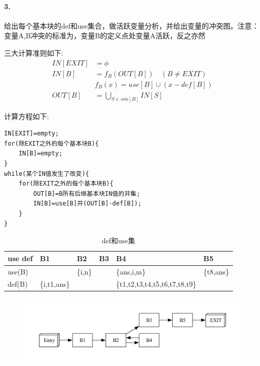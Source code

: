 \documentclass[UTF8]{ctexart} %
\begin{document}
\paragraph{3.} 给出每个基本块的def和use集合，做活跃变量分析，并给出变量的冲突图。注意：变量A,B冲突的标准为，变量B的定义点处变量A活跃，反之亦然

三大计算准则如下:
\begin{equation}
    \begin{aligned}
        IN[EXIT] & =\phi                            \\
        IN[B]    & =f_B(OUT[B]) \quad (B\neq EXIT)  \\
                 & f_B(x)    =use[B]\cup (x-def[B]) \\
        OUT[B]   & =\bigcup_{S\in son[B]}IN[S]
    \end{aligned}
\end{equation}

计算方程如下:
\begin{lstlisting}
IN[EXIT]=empty;
for(除EXIT之外的每个基本块B){
    IN[B]=empty;
}
while(某个IN值发生了改变){
    for(除EXIT之外的每个基本块B){
        OUT[B]=B所有后继基本块IN值的并集;
        IN[B]=use[B]并(OUT[B]-def[B]);
    }
}
\end{lstlisting}

\newpage

\begin{table}[H]
    \centering
    \begin{tabular}{|p{1.1cm}<{\centering}|p{1.55cm}<{\centering}|p{0.8cm}<{\centering}|p{0.45cm}<{\centering}|p{4.2cm}<{\centering}|p{1.4cm}<{\centering}|}
        \hline
        use def & B1           & B2      & B3 & B4                             & B5         \\
        \hline
        use(B)  &              & \{i,n\} &    & \{ans,i,m\}                    & \{t8,ans\} \\
        \hline
        def(B)  & \{i,t1,ans\} &         &    & \{t1,t2,t3,t4,t5,t6,t7,t8,t9\} &            \\
        \hline
    \end{tabular}
    \caption{def和use集}
\end{table}

\begin{figure}[H]
    \centering
    \includegraphics[width=\textwidth]{assets/control-flow-simple.pdf}
\end{figure}
\end{document}
